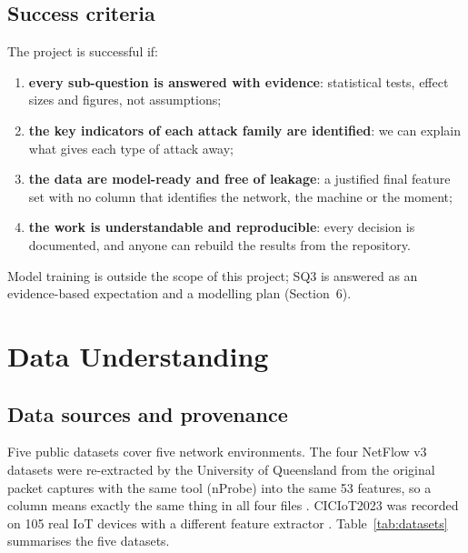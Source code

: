 \documentclass[12pt,a4paper]{article}
\begin{document}
\subsection{Success criteria}
The project is successful if:
\begin{enumerate}
  \item \textbf{every sub-question is answered with evidence}: statistical tests, effect sizes and figures, not
        assumptions;
  \item \textbf{the key indicators of each attack family are identified}: we can explain what gives each type of
        attack away;
  \item \textbf{the data are model-ready and free of leakage}: a justified final feature set with no column that
        identifies the network, the machine or the moment;
  \item \textbf{the work is understandable and reproducible}: every decision is documented, and anyone can rebuild
        the results from the repository.
\end{enumerate}
Model training is outside the scope of this project; SQ3 is answered as an evidence-based expectation and a modelling
plan (Section~6).

\section{Data Understanding}

\subsection{Data sources and provenance}
Five public datasets cover five network environments. The four NetFlow v3 datasets were re-extracted by the University
of Queensland from the original packet captures with the same tool (nProbe) into the same 53 features, so a column
means exactly the same thing in all four files \cite{luay2025,sarhan2022}. CICIoT2023 was recorded on 105 real IoT
devices with a different feature extractor \cite{ciciot2023}. Table~\ref{tab:datasets} summarises the five datasets.
\end{document}

